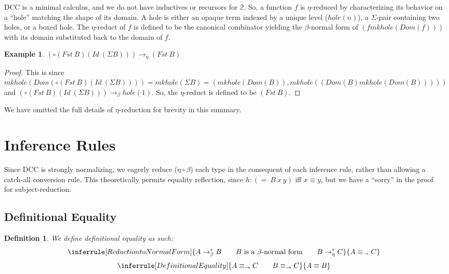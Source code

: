 \documentclass{article}
\newtheorem{definition}{Definition}
\newtheorem{example}{Example}
\newcommand{\arr}{\rightarrow}
\newcommand{\barr}{\arr_{\beta}}
\newcommand{\earr}{\arr_{\eta}}
\begin{document}
DCC is a minimal calculus, and we do not have inductives or recursors for \(\mathbb{2}\). So, a function \(f\) is \(\eta\)-reduced by characterizing its behavior on a ``hole'' matching the shape of its domain. A hole is either an opaque term indexed by a unique level (\(hole(n)\)), a \(\Sigma\)-pair containing two holes, or a boxed hole. The \(\eta\)-reduct of \(f\) is defined to be the canonical combinator yielding the \(\beta\)-normal form of \((f mkhole(Dom(f)))\) with its domain substituted back to the domain of \(f\).

\begin{example}
  \((\circ (Fst\ B) (Id\ (\Sigma B))) \earr (Fst\ B)\)
\end{example}

\begin{proof}
  This is since \(mkhole(Dom(\circ (Fst\ B) (Id\ (\Sigma B)))) = mkhole(\Sigma B) = (mkhole(Dom(B)), mkhole((Dom(B) mkhole(Dom(B)))))\) and \((\circ (Fst\ B) (Id\ (\Sigma B))) \barr hole(1)\). So, the \(\eta\)-reduct is defined to be \((Fst\ B)\).
\end{proof}

We have omitted the full details of \(\eta\)-reduction for brevity in this summary.

\section{Inference Rules}

Since DCC is strongly normalizing, we eagerly reduce (\(\eta \circ \beta\)) each type in the consequent of each inference rule, rather than allowing a catch-all conversion rule. This theoretically permits equality reflection, since \(h : (=\ B\ x\ y)\) iff \(x \equiv y\), but we have a ``sorry'' in the proof for subject-reduction.

\subsection{Definitional Equality}

\begin{definition}
  We define definitional equality as such:
  \begin{equation}
    \inferrule[Reduction to Normal Form]
    { A \arr_{\beta}^* B \qquad \text{\(B\) is a \(\beta\)-normal form} \qquad B \arr_{\eta}^* C}
    { A \equiv_{\arr} C}
  \end{equation}
  \begin{equation}
    \inferrule[Definitional Equality]
    { A \equiv_{\arr} C \qquad B \equiv_{\arr} C}
    { A \equiv B}
  \end{equation}
\end{definition}
\end{document}
